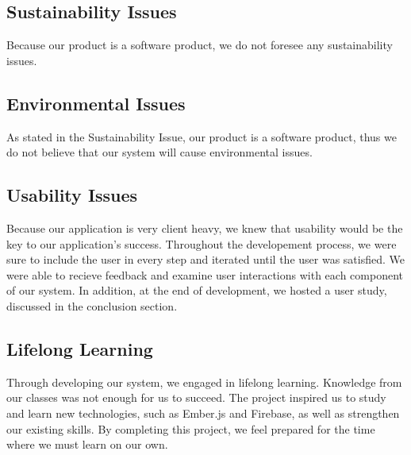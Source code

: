 \subsection{Sustainability Issues}
\par Because our product is a software product, we do not foresee any sustainability issues.
\subsection{Environmental Issues}
\par As stated in the Sustainability Issue, our product is a software product, thus we do not believe that our system will cause environmental issues.
\subsection{Usability Issues}
\par Because our application is very client heavy, we knew that usability would be the key to our application's success. Throughout the developement process, we were sure to include the user in every step and iterated until the user was satisfied. We were able to recieve feedback and examine user interactions with each component of our system. In addition, at the end of development, we hosted a user study, discussed in the conclusion section. 
\subsection{Lifelong Learning}
Through developing our system, we engaged in lifelong learning. Knowledge from our classes was not enough for us to succeed. The project inspired us to study and learn new technologies, such as Ember.js and Firebase, as well as strengthen our existing skills. By completing this project, we feel prepared for the time where we must learn on our own. 

